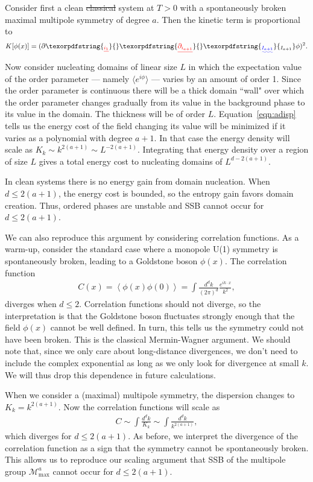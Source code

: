 \documentclass[pra,aps,twocolumn, amsfonts,amsmath,amssymb,nofootinbib,superscriptaddress]{revtex4-2}
\renewcommand{\max}{\text{max}}
\providecommand{\DIFaddtex}[1]{{\protect\color{blue}\uwave{#1}}} %
\providecommand{\DIFdeltex}[1]{{\protect\color{red}\sout{#1}}}                      %
\providecommand{\DIFaddbegin}{} %
\providecommand{\DIFaddend}{} %
\providecommand{\DIFdelbegin}{} %
\providecommand{\DIFdelend}{} %
\providecommand{\DIFadd}[1]{\texorpdfstring{\DIFaddtex{#1}}{#1}} %
\providecommand{\DIFdel}[1]{\texorpdfstring{\DIFdeltex{#1}}{}} %
\newcommand{\DIFscaledelfig}{0.5}
\newlength{\DIFdelgraphicswidth} %
\newlength{\DIFdelgraphicsheight} %
\newcommand{\DIFaddincludegraphics}[2][]{{\color{blue}\fbox{\DIFOincludegraphics[#1]{#2}}}} %
\newcommand{\DIFdelincludegraphics}[2][]{%
\sbox{\DIFdelgraphicsbox}{\DIFOincludegraphics[#1]{#2}}%
\settoboxwidth{\DIFdelgraphicswidth}{\DIFdelgraphicsbox} %
\settoboxtotalheight{\DIFdelgraphicsheight}{\DIFdelgraphicsbox} %
\scalebox{\DIFscaledelfig}{%
\parbox[b]{\DIFdelgraphicswidth}{\usebox{\DIFdelgraphicsbox}\\[-\baselineskip] \rule{\DIFdelgraphicswidth}{0em}}\llap{\resizebox{\DIFdelgraphicswidth}{\DIFdelgraphicsheight}{%
\setlength{\unitlength}{\DIFdelgraphicswidth}%
\begin{picture}(1,1)%
\thicklines\linethickness{2pt} %
{\color[rgb]{1,0,0}\put(0,0){\framebox(1,1){}}}%
{\color[rgb]{1,0,0}\put(0,0){\line( 1,1){1}}}%
{\color[rgb]{1,0,0}\put(0,1){\line(1,-1){1}}}%
\end{picture}%
}\hspace*{3pt}}} %
} %
\DeclareRobustCommand{\DIFaddbegin}{\DIFOaddbegin \let\includegraphics\DIFaddincludegraphics} %
\DeclareRobustCommand{\DIFaddend}{\DIFOaddend \let\includegraphics\DIFOincludegraphics} %
\DeclareRobustCommand{\DIFdelbegin}{\DIFOdelbegin \let\includegraphics\DIFdelincludegraphics} %
\DeclareRobustCommand{\DIFdelend}{\DIFOaddend \let\includegraphics\DIFOincludegraphics} %
\begin{document}
Consider first a clean \DIFdelbegin \DIFdel{classical }\DIFdelend system at $T>0$ with a spontaneously broken maximal multipole symmetry of degree $a$.
Then the kinetic term is proportional to 
\begin{align}
K[\phi(x)] = (\partial\DIFdelbegin \DIFdel{_{i_1} }%
\DIFdel{\partial_{i_{a+1}} }\DIFdelend \DIFaddbegin \DIFadd{_{I_{a+1}} }\DIFaddend \phi)^2. \label{eqn:adisp}
\end{align} 
Now consider nucleating domains of linear size $L$ in which the expectation value of the order parameter --- namely $\langle e^{i\phi}\rangle$ --- varies by an amount of order 1. Since the order parameter is continuous there will be a thick domain ``wall" over which the order parameter changes gradually from its value in the background phase to its value in the domain. The thickness will be of order $L$.
Equation~\ref{eqn:adisp} tells us the  energy cost of the field changing its value will be minimized if it varies as a polynomial with degree $a+1$. In that case the energy density will scale as $K_k \sim k^{2(a+1)} \sim L^{-2(a+1)}$. Integrating that energy density over a region of size $L$ gives a total energy cost to nucleating domains of $L^{d-2(a+1)}$.

In clean systems there is no energy gain from domain nucleation. When $d\le2(a+1)$, the energy cost is bounded, so the entropy gain favors domain creation. Thus, ordered phases are unstable and SSB cannot occur for $d\le2(a+1)$.

We can also reproduce this argument by considering correlation functions. As a warm-up, consider the standard case where a monopole U(1) symmetry is spontaneously broken, leading to a Goldstone boson $\phi(x)$. The correlation function
\begin{align}
C(x) = \left\langle \phi(x) \phi(0) \right\rangle = \int \frac{d^dk}{(2\pi)^d} \frac{e^{i k \cdot x}}{k^2}, 
\end{align}
diverges when $d\le 2$. Correlation functions should not diverge, so the interpretation is that the Goldstone boson fluctuates strongly enough that the field $\phi(x)$ cannot be well defined. In turn, this tells us the symmetry could not have been broken. This is the classical Mermin-Wagner argument. We should note that, since we only care about long-distance divergences, we don't need to include the complex exponential as long as we only look for divergence at small $k$. We will thus drop this dependence in future calculations. 

When we consider a (maximal) multipole symmetry, the dispersion changes to $K_k=k^{2(a+1)}$. Now the correlation functions will scale as 
\begin{align}
C \sim \int \frac{d^dk}{K_k} \sim \int \frac{d^dk}{k^{2(a+1)}}, \label{eqn:correl}
\end{align}
which diverges for $d\le2(a+1)$. As before, we interpret the divergence of the correlation function as a sign that the symmetry cannot be spontaneously broken. This allows us to reproduce our scaling argument that SSB of the multipole group $\mathcal{M}^a_\max$ cannot occur for $d\le2(a+1)$.
\end{document}

